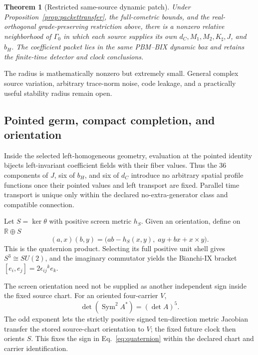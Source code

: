 \documentclass[11pt]{article}
\newtheorem{theorem}{Theorem}[section]
\theoremstyle{definition}
\theoremstyle{remark}
\newcommand{\Ker}{\operatorname{ker}}
\begin{document}
\begin{theorem}[Restricted same-source dynamic patch]\label{thm:sourcepatch}
Under Proposition~\ref{prop:packettransfer}, the full-cometric bounds, and the real-orthogonal grade-preserving restriction above, there is a nonzero relative neighborhood of $\Gamma_0$ in which each source supplies its own $d_C,M_1,M_2,K_\sharp,J$, and $b_H$. The coefficient packet lies in the same PBM--BIX dynamic box and retains the finite-time detector and clock conclusions.
\end{theorem}

The radius is mathematically nonzero but extremely small. General complex source variation, arbitrary trace-norm noise, code leakage, and a practically useful stability radius remain open.

\subsection{Pointed germ, compact completion, and orientation}

Inside the selected left-homogeneous geometry, evaluation at the pointed identity bijects left-invariant coefficient fields with their fiber values. Thus the 36 components of $J$, six of $b_H$, and six of $d_C$ introduce no arbitrary spatial profile functions once their pointed values and left transport are fixed. Parallel time transport is unique only within the declared no-extra-generator class and compatible connection.

Let $S=\Ker\theta$ with positive screen metric $h_S$. Given an orientation, define on $\mathbb R\oplus S$
\begin{equation}\label{eq:quaternion}
 (a,x)(b,y)=\bigl(ab-h_S(x,y),\;ay+bx+x\times y\bigr).
\end{equation}
This is the quaternion product. Selecting its full positive unit shell gives $S^3\cong SU(2)$, and the imaginary commutator yields the Bianchi-IX bracket $[e_i,e_j]=2\epsilon_{ij}{}^ke_k$.

The screen orientation need not be supplied as another independent sign inside the fixed source chart. For an oriented four-carrier $V$,
\begin{equation}
 \det\!\left(\operatorname{Sym}^2 A^*\right)=(\det A)^5.
\end{equation}
The odd exponent lets the strictly positive signed ten-direction metric Jacobian transfer the stored source-chart orientation to $V$; the fixed future clock then orients $S$. This fixes the sign in Eq.~\eqref{eq:quaternion} within the declared chart and carrier identification.
\end{document}
